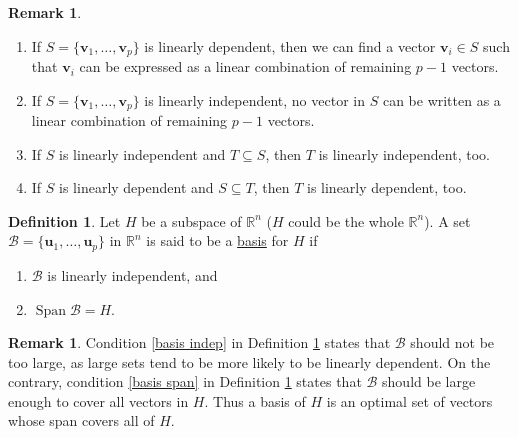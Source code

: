 \documentclass[12pt,letterpaper]{book}
\numberwithin{equation}{section}
\theoremstyle{definition}
\newtheorem{defi}[thm]{\textbf{Definition}}
\newtheorem{remark}[thm]{\textbf{Remark}}
\newcommand{\vu}{\bm{u}}
\newcommand{\vv}{\bm{v}}
\newcommand{\Span}{\operatorname{Span}}
\begin{document}
\begin{remark} \quad
\begin{enumerate}
\item If $S=\{\vv_1,\ldots,\vv_p\}$ is linearly
dependent, then we can find a vector $\vv_i\in S$ such that $\vv_i$ can
be expressed as a linear combination of remaining $p-1$ vectors.
\item If $S=\{\vv_1,\ldots,\vv_p\}$ is linearly independent, no vector in
$S$ can be written as a linear combination of remaining
$p-1$ vectors.
\item If $S$ is linearly independent and $T\subseteq S$, then $T$ is linearly independent, too.
\item If $S$ is linearly dependent and $S\subseteq T$, then $T$ is linearly dependent, too.
\end{enumerate}
\end{remark}

\begin{defi}\label{basis def} Let $H$ be a subspace of $\mathbb{R}^n$ ($H$ could be the whole $\mathbb{R}^n$). A set $\mathscr{B}=\{\vu_1,\ldots,\vu_p\}$
in $\mathbb{R}^n$ is said to be a
\underline{basis} for $H$ if
\begin{enumerate}
\item\label{basis indep} $\mathscr{B}$ is linearly independent, and
\item\label{basis span} $\Span\mathscr{B}=H$.
\end{enumerate}
\end{defi}

\begin{remark}
Condition \ref{basis indep} in Definition \ref{basis def} states that $\mathscr{B}$ should not be too large, as large sets tend to be more likely to be linearly dependent. On the contrary, condition \ref{basis span} in Definition \ref{basis def} states that $\mathscr{B}$ should be large enough to cover all vectors in $H$. Thus a basis of $H$ is an optimal set of vectors whose span covers all of $H$.
\end{remark}
\end{document}

